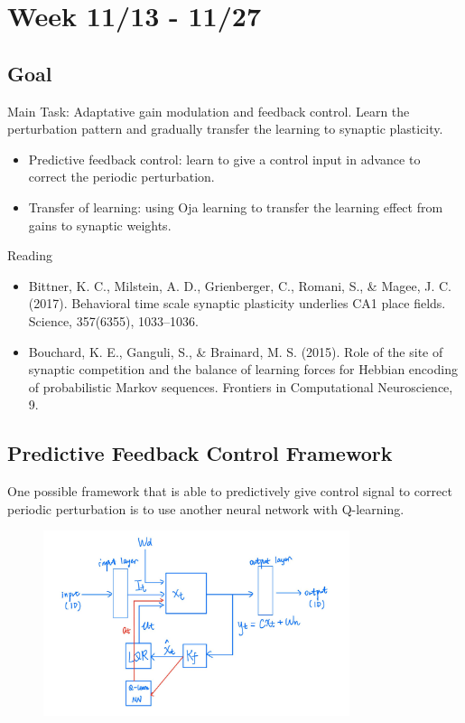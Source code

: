 \documentclass[12pt, a4paper]{article}
\begin{document}
\newpage


\section*{Week 11/13 - 11/27}

\subsection*{Goal}

\noindent
Main Task: Adaptative gain modulation and feedback control. Learn the perturbation pattern and gradually transfer the learning to synaptic plasticity.

\begin{itemize}
    \item Predictive feedback control: learn to give a control input in advance to correct the periodic perturbation.
    \item Transfer of learning: using Oja learning to transfer the learning effect from gains to synaptic weights.
\end{itemize}

\noindent
Reading

\begin{itemize}
    \item Bittner, K. C., Milstein, A. D., Grienberger, C., Romani, S., \& Magee, J. C. (2017). Behavioral time scale synaptic plasticity underlies CA1 place fields. Science, 357(6355), 1033–1036.
    \item Bouchard, K. E., Ganguli, S., \& Brainard, M. S. (2015). Role of the site of synaptic competition and the balance of learning forces for Hebbian encoding of probabilistic Markov sequences. Frontiers in Computational Neuroscience, 9.
\end{itemize}

\newpage

\subsection*{Predictive Feedback Control Framework}

One possible framework that is able to predictively give control signal to correct periodic perturbation is to use another neural network with Q-learning.

\begin{figure}[H]
    \centering
    \includegraphics[width=0.8\textwidth]{RNN/ourRNN/analysis/fig/qlearn_struc.jpg}
\end{figure}
\end{document}

